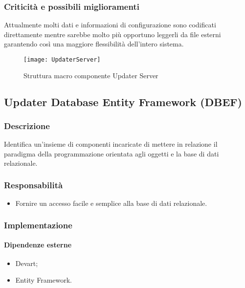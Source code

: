 \documentclass[../RelazioneFinale.tex]{subfiles}
\begin{document}
			
			\subsubsection{Criticità e possibili miglioramenti}
				Attualmente molti dati e informazioni di configurazione sono codificati direttamente mentre sarebbe molto più opportuno leggerli da file esterni garantendo così una maggiore flessibilità dell'intero sistema.
				
			\begin{figure}[p]
				\texttt{[image: UpdaterServer]}
				\label{fig:UpdaterServer}
				\caption{Struttura macro componente Updater Server}
			\end{figure}
		
\newpage
		
		\subsection{Updater Database Entity Framework (DBEF)}
		
			\subsubsection{Descrizione}
				Identifica un'insieme di componenti incaricate di mettere in relazione il paradigma della programmazione orientata agli oggetti e la base di dati relazionale.
			
			\subsubsection{Responsabilità}
				\begin{itemize}
					\item Fornire un accesso facile e semplice alla base di dati relazionale.
				\end{itemize}
			
			\subsubsection{Implementazione}
			
				\paragraph{Dipendenze esterne}
					\begin{itemize}
						\item Devart;
						\item Entity Framework.
					\end{itemize}
				
\end{document}
